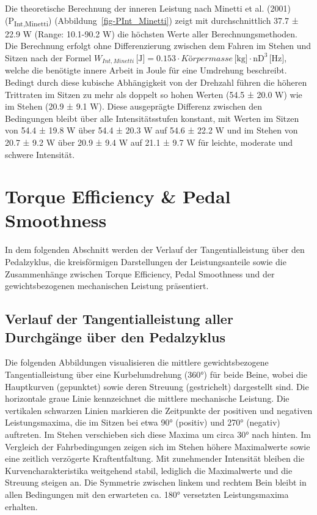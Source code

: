 \documentclass[
  letterpaper,
  DIV=11]{scrartcl}
\begin{document}
Die theoretische Berechnung der inneren Leistung nach Minetti et al.
(2001) (P\textsubscript{Int,Minetti}) (Abbildung~\ref{fig-PInt_Minetti})
zeigt mit durchschnittlich 37.7 ± 22.9 W (Range: 10.1-90.2 W) die
höchsten Werte aller Berechnungsmethoden. Die Berechnung erfolgt ohne
Differenzierung zwischen dem Fahren im Stehen und Sitzen nach der Formel
\(W_{Int,Minetti}\,\text{[J]} = 0.153 \cdot Körpermasse\,\text{[kg]} \cdot \text{nD}^3\,\text{[Hz]}\),
welche die benötigte innere Arbeit in Joule für eine Umdrehung
beschreibt. Bedingt durch diese kubische Abhängigkeit von der Drehzahl
führen die höheren Trittraten im Sitzen zu mehr als doppelt so hohen
Werten (54.5 ± 20.0 W) wie im Stehen (20.9 ± 9.1 W). Diese ausgeprägte
Differenz zwischen den Bedingungen bleibt über alle Intensitätsstufen
konstant, mit Werten im Sitzen von 54.4 ± 19.8 W über 54.4 ± 20.3 W auf
54.6 ± 22.2 W und im Stehen von 20.7 ± 9.2 W über 20.9 ± 9.4 W auf 21.1
± 9.7 W für leichte, moderate und schwere Intensität.

\section{Torque Efficiency \& Pedal
Smoothness}\label{torque-efficiency-pedal-smoothness}

In dem folgenden Abschnitt werden der Verlauf der Tangentialleistung
über den Pedalzyklus, die kreisförmigen Darstellungen der
Leistungsanteile sowie die Zusammenhänge zwischen Torque Efficiency,
Pedal Smoothness und der gewichtsbezogenen mechanischen Leistung
präsentiert.

\subsection{Verlauf der Tangentialleistung aller Durchgänge über den
Pedalzyklus}\label{verlauf-der-tangentialleistung-aller-durchguxe4nge-uxfcber-den-pedalzyklus}

Die folgenden Abbildungen visualisieren die mittlere gewichtsbezogene
Tangentialleistung über eine Kurbelumdrehung (360°) für beide Beine,
wobei die Hauptkurven (gepunktet) sowie deren Streuung (gestrichelt)
dargestellt sind. Die horizontale graue Linie kennzeichnet die mittlere
mechanische Leistung. Die vertikalen schwarzen Linien markieren die
Zeitpunkte der positiven und negativen Leistungsmaxima, die im Sitzen
bei etwa 90° (positiv) und 270° (negativ) auftreten. Im Stehen
verschieben sich diese Maxima um circa 30° nach hinten. Im Vergleich der
Fahrbedingungen zeigen sich im Stehen höhere Maximalwerte sowie eine
zeitlich verzögerte Kraftentfaltung. Mit zunehmender Intensität bleiben
die Kurvencharakteristika weitgehend stabil, lediglich die Maximalwerte
und die Streuung steigen an. Die Symmetrie zwischen linkem und rechtem
Bein bleibt in allen Bedingungen mit den erwarteten ca. 180° versetzten
Leistungsmaxima erhalten.
\end{document}
